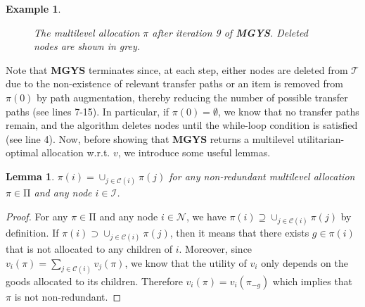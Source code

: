 \documentclass[]{article}
\newtheorem{example}{Example}
\newtheorem{lemma}{Lemma}
\newcommand{\tree}{\mathcal{T}}
\newcommand{\nodes}{\mathcal{N}}
\newcommand{\children}{\mathcal{C}}
\newcommand{\internal}{\mathcal{I}}
\newcommand{\mallocations}{\mathrm{\Pi}}
\begin{document}
\begin{example}
\begin{figure}[H]
    \caption{The multilevel allocation $\pi$ after iteration 9 of {\bf MGYS}. Deleted nodes are shown in grey.}
    \label{fig: pi iterations 8 and 9}
\end{figure}

\end{example}

Note that {\bf MGYS} terminates since, at each step, either nodes are deleted from $\tree$ due to the non-existence of relevant transfer paths or an item is removed from $\pi(0)$ by path augmentation, thereby reducing the number of possible transfer paths (see lines 7-15). In particular, if $\pi(0)=\emptyset$, we know that no transfer paths remain, and the algorithm deletes nodes until the while-loop condition is satisfied (see line 4). Now, before showing that {\bf MGYS} returns a multilevel utilitarian-optimal allocation w.r.t. $v$, we introduce some useful lemmas.

\begin{lemma} \label{lemma: general bundle = union enfants}
    $\pi(i) = \cup_{j \in\children(i)} \pi(j)$ for any non-redundant multilevel allocation $\pi \in \mallocations$ and any node $i \in \internal$.
\end{lemma}

\begin{proof}
For any $\pi \in \mallocations$ and any node $i \in \nodes$, we have $\pi(i) \supseteq \cup_{j \in \children(i)} \pi(j)$ by definition. If $\pi(i) \supset \cup_{j \in \children(i)} \pi(j)$, then it means that there exists $g \in \pi(i)$ that is not allocated to any children of $i$. Moreover, since $v_i(\pi)=\sum_{j \in \children(i)} v_j(\pi)$, we know that the utility of $v_i$ only depends on the goods allocated to its children. Therefore $v_i(\pi) = v_i(\pi_{-g})$ which implies that $\pi$ is not non-redundant.
\end{proof}
\end{document}
